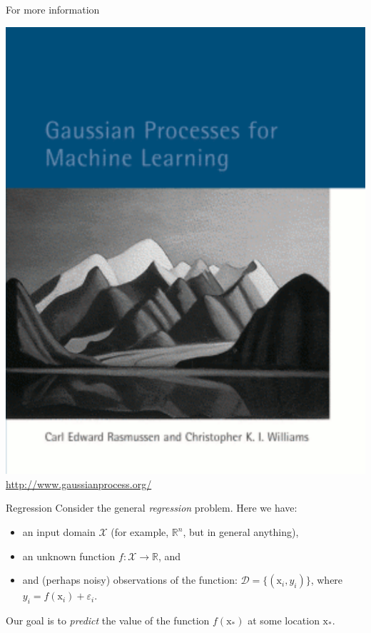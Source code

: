 \documentclass[xcolor={dvipsnames},hyperref={breaklinks=true},12pt]{beamer}
\newcommand{\mc}[1]{\mathcal{#1}}
\newcommand{\data}{\mc{D}}
\renewcommand{\vec}[1]{\bm{\mathrm{#1}}}
\newcommand{\R}{\mathbb{R}}
\renewcommand{\epsilon}{\varepsilon}
\newcommand{\emphr}[1]{{\textcolor{or}{\itshape #1}}}
\begin{document}
\begin{frame}{For more information}
  \begin{center}
    \includegraphics[scale=0.4]{figures/rwcover.pdf} \\
    \url{http://www.gaussianprocess.org/}
  \end{center}
\end{frame}

\begin{frame}{Regression}
  Consider the general \emphr{regression} problem.  Here we have:

  \begin{itemize}
    \item an input domain $\mc{X}$ (for example, $\R^n$, but in
      general anything),
    \item an unknown function $f\colon \mc{X} \to \R$, and
    \item and (perhaps noisy) observations of the function: $\data =
      \bigl\{ (\vec{x}_i, y_i) \bigr\}$, where $y_i = f(\vec{x}_i) +
      \epsilon_i$.
  \end{itemize}

  Our goal is to \emphr{predict} the value of the function
  $f(\vec{x}_\ast)$ at some location $\vec{x}_\ast$.
\end{frame}
\end{document}
